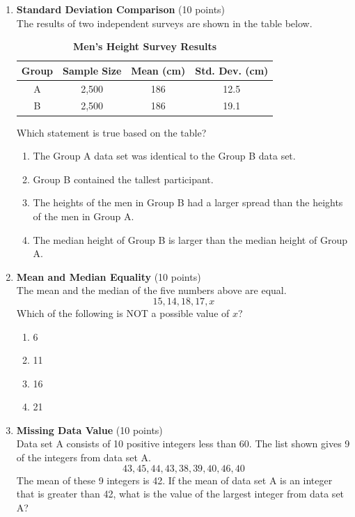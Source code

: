 \begin{enumerate}
  \item \textbf{Standard Deviation Comparison} (10 points)\\
  The results of two independent surveys are shown in the table below.
  \begin{table}[h!]
  \centering
  \renewcommand{\arraystretch}{1.3}
  \setlength{\tabcolsep}{8pt}
  \caption*{\textbf{Men's Height Survey Results}}
  \begin{tabular}{|c|c|c|c|}
  \hline
  \rowcolor[HTML]{E0E0E0}
  \textbf{Group} & \textbf{Sample Size} & \textbf{Mean (cm)} & \textbf{Std. Dev. (cm)} \\
  \hline
  A & 2,500 & 186 & 12.5 \\
  B & 2,500 & 186 & 19.1 \\
  \hline
  \end{tabular}
  \end{table}
  Which statement is true based on the table?
  \begin{enumerate}[label=(\Alph*)]
    \item The Group A data set was identical to the Group B data set.
    \item Group B contained the tallest participant.
    \item The heights of the men in Group B had a larger spread than the heights of the men in Group A.
    \item The median height of Group B is larger than the median height of Group A.
  \end{enumerate}
  \begin{subanswer}
  \end{subanswer}

  \item \textbf{Mean and Median Equality} (10 points)\\
  The mean and the median of the five numbers above are equal.
  \[
  15,14,18,17, x
  \]
  Which of the following is NOT a possible value of $x$?
  \begin{enumerate}[label=(\Alph*)]
    \item 6
    \item 11
    \item 16
    \item 21
  \end{enumerate}
  \begin{subanswer}
  \end{subanswer}

  \item \textbf{Missing Data Value} (10 points)\\
  Data set A consists of 10 positive integers less than 60. The list shown gives 9 of the integers from data set A.
  \[
  43,45,44,43,38,39,40,46,40
  \]
  The mean of these 9 integers is 42. If the mean of data set A is an integer that is greater than 42, what is the value of the largest integer from data set A?
  \begin{subanswer}
  \end{subanswer}



\end{enumerate}
